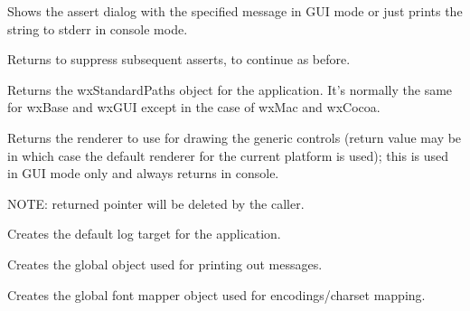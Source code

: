 
Shows the assert dialog with the specified message in GUI mode or just prints
the string to stderr in console mode.

Returns \true to suppress subsequent asserts, \false to continue as before.



\label{wxapptraitsgetstandardpaths}


Returns the wxStandardPaths object for the application.
It's normally the same for wxBase and wxGUI except in the case of wxMac and wxCocoa.



\label{wxapptraitscreaterenderer}


Returns the renderer to use for drawing the generic controls (return value may be \NULL
in which case the default renderer for the current platform is used);
this is used in GUI mode only and always returns \NULL in console.

NOTE: returned pointer will be deleted by the caller.



\label{wxapptraitscreatelogtarget}


Creates the default log target for the application.



\label{wxapptraitscreatemessageoutput}


Creates the global object used for printing out messages.



\label{wxapptraitscreatefontmapper}


Creates the global font mapper object used for encodings/charset mapping.


